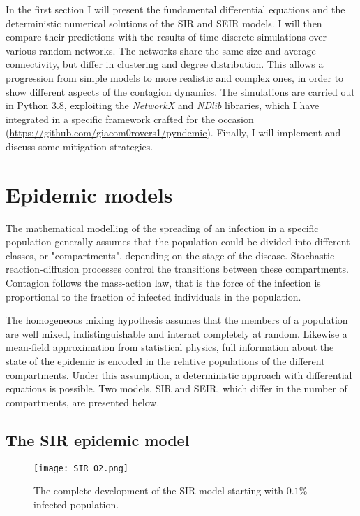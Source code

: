 \documentclass[DIV=12, BCOR=0pt]{scrartcl}  %
\begin{document}
 	In the first section I will present the fundamental differential equations and the deterministic numerical solutions of the SIR and SEIR models. I will then compare their predictions with the results of time-discrete simulations over various random networks. The networks share the same size and average connectivity, but differ in clustering and degree distribution. This allows a progression from simple models to more realistic and complex ones, in order to show different aspects of the contagion dynamics. The simulations are carried out in Python 3.8, exploiting the \textit{NetworkX} and \textit{NDlib} libraries, which I have integrated in a specific framework crafted for the occasion (\href{https://github.com/giacom0rovers1/pyndemic}{https://github.com/giacom0rovers1/pyndemic}). %
 	Finally, I will implement and discuss some mitigation strategies.
  
  \section{Epidemic models}
  \label{sec:theory}
	The mathematical modelling of the spreading of an infection in a specific population generally assumes that the population could be divided into different classes, or "compartments", depending on the stage of the disease.
	Stochastic reaction-diffusion processes control the transitions between these compartments. 
	Contagion follows the mass-action law, that is the force of the infection is proportional to the fraction of infected individuals in the population.
	
  The homogeneous mixing hypothesis assumes that the members of a population are well mixed, indistinguishable and interact completely at random.
  Likewise a mean-field approximation from statistical physics, full information about the state of the epidemic is encoded in the relative populations of the different compartments. Under this assumption, a deterministic approach with differential equations is possible. Two models, SIR and SEIR, which differ in the number of compartments, are presented below.
   
  \subsection{The SIR epidemic model}
  
  \begin{figure}[h]
  	\centering
  	\texttt{[image: SIR\_02.png]}
  	\caption{The complete development of the SIR model starting with $0.1\%$ infected population.}
  	\label{fig:SIRtot}
  \end{figure}
\end{document}
